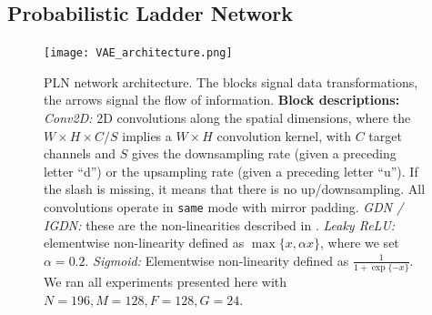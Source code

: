 \subsection{Probabilistic Ladder Network}
\label{sec:prob_ladder_networks}

\begin{figure}
  \centering
  \texttt{[image: VAE\_architecture.png]}
  \caption{PLN network architecture. The blocks signal data transformations, the
    arrows signal the flow of information. \textbf{Block descriptions:}
    \textit{Conv2D:} 2D convolutions along the spatial dimensions, where the
    $W\times H \times C / S$ implies a $W \times H$ convolution kernel, with $C$
  target channels and $S$ gives the downsampling rate (given a preceding letter
  ``d'') or the upsampling rate (given a preceding letter ``u''). If the slash
  is missing, it means that there is no up/downsampling. All convolutions operate
  in \texttt{same} mode with mirror padding. \textit{GDN / IGDN:} these are the
  non-linearities described in \cite{balle2016end}. \textit{Leaky ReLU:}
  elementwise non-linearity defined as $\max\{x, \alpha x\}$, where we set
  $\alpha=0.2$. \textit{Sigmoid:} Elementwise non-linearity defined as
  $\frac{1}{1 + \exp\{-x\}}$. We ran all
  experiments presented here with $N = 196, M = 128, F = 128, G = 24$.}
  \label{fig:pln_architecture}
\end{figure}

